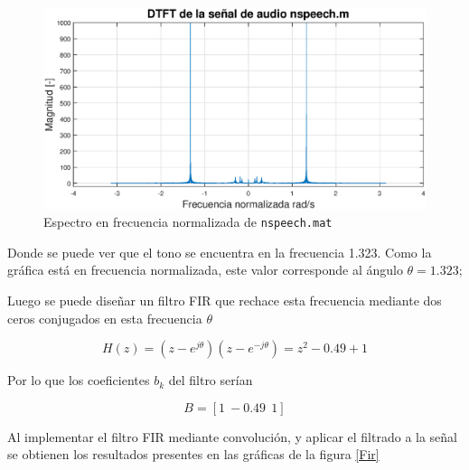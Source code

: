 \begin{enumerate}
\begin{figure}[H]
    \centering
    \includegraphics[scale = 0.6]{Figuras/p1_3-DTFT.eps}
    \caption{Espectro en frecuencia normalizada de \texttt{nspeech.mat}}
    \label{nspeech_tone}
\end{figure}

\end{enumerate}

Donde se puede ver que el tono se encuentra en la frecuencia 1.323. Como la gráfica está en frecuencia normalizada, este valor corresponde al ángulo $\theta = 1.323$;

Luego se puede diseñar un filtro FIR que rechace esta frecuencia mediante dos ceros conjugados en esta frecuencia $\theta$

$$ H(z) = (z-e^{j\theta})(z - e^{-j\theta})  = z^2 - 0.49 + 1$$

Por lo que los coeficientes $b_k$ del filtro serían

$$B = [1 ~-0.49 ~~1]$$


Al implementar el filtro FIR mediante convolución, y aplicar el filtrado a la señal se obtienen los resultados presentes en las gráficas de la figura \ref{Fir}

